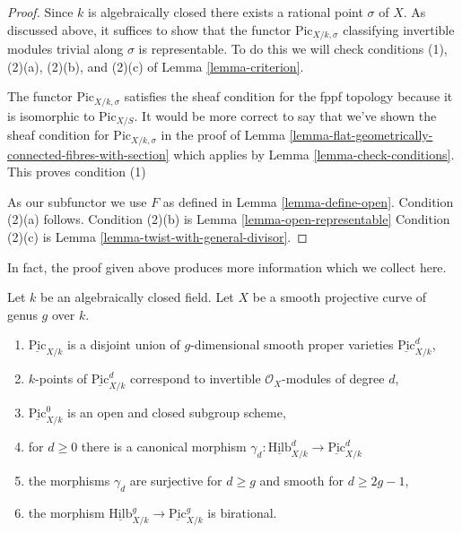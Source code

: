 \begin{proof}
Since $k$ is algebraically closed there exists a rational point $\sigma$
of $X$. As discussed above, it suffices to show that the functor
$\text{Pic}_{X/k, \sigma}$ classifying invertible modules trivial along
$\sigma$ is representable. To do this we will check conditions (1),
(2)(a), (2)(b), and (2)(c) of
Lemma \ref{lemma-criterion}.

\medskip\noindent
The functor $\text{Pic}_{X/k, \sigma}$ satisfies the sheaf condition
for the fppf topology because it is isomorphic to $\text{Pic}_{X/S}$.
It would be more correct to say that we've shown the sheaf condition
for $\text{Pic}_{X/k, \sigma}$ in the proof of
Lemma \ref{lemma-flat-geometrically-connected-fibres-with-section}
which applies by Lemma \ref{lemma-check-conditions}.
This proves condition (1)

\medskip\noindent
As our subfunctor we use $F$ as defined in Lemma \ref{lemma-define-open}.
Condition (2)(a) follows.
Condition (2)(b) is Lemma \ref{lemma-open-representable}
Condition (2)(c) is Lemma \ref{lemma-twist-with-general-divisor}.
\end{proof}

\noindent
In fact, the proof given above produces more information which we
collect here.

\begin{lemma}
\label{lemma-picard-pieces}
Let $k$ be an algebraically closed field. Let $X$ be a smooth projective
curve of genus $g$ over $k$.
\begin{enumerate}
\item $\underline{\text{Pic}}_{X/k}$ is a disjoint union of
$g$-dimensional smooth proper varieties $\underline{\text{Pic}}^d_{X/k}$,
\item $k$-points of $\underline{\text{Pic}}^d_{X/k}$
correspond to invertible $\mathcal{O}_X$-modules of degree $d$,
\item $\underline{\text{Pic}}^0_{X/k}$ is an open and closed subgroup scheme,
\item for $d \geq 0$ there is a canonical morphism
$\gamma_d :
\underline{\text{Hilb}}^d_{X/k} \to \underline{\text{Pic}}^d_{X/k}$
\item the morphisms $\gamma_d$
are surjective for $d \geq g$ and smooth for $d \geq 2g - 1$,
\item the morphism
$\underline{\text{Hilb}}^g_{X/k} \to \underline{\text{Pic}}^g_{X/k}$
is birational.
\end{enumerate}
\end{lemma}

